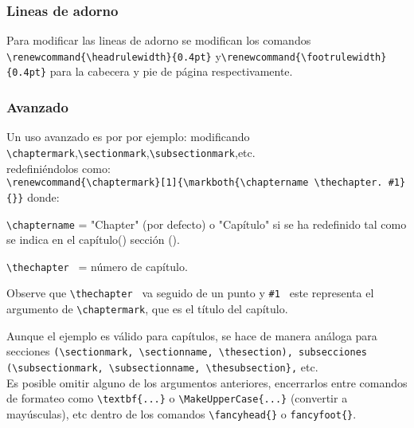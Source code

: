 \subsubsection{Lineas de adorno}
Para modificar las lineas de adorno se modifican los comandos \\
\lstinline+\renewcommand{\headrulewidth}{0.4pt}+ y\lstinline+\renewcommand{\footrulewidth}{0.4pt}+ para la cabe\-cera y pie de página respectivamente.
\subsubsection{Avanzado}
Un uso avanzado es por por ejemplo: modificando \lstinline+\chaptermark+,\lstinline+\sectionmark+,\lstinline+\subsectionmark+,etc.\\
redefiniéndolos como:\\
\lstinline+\renewcommand{\chaptermark}[1]{\markboth{\chaptername \thechapter. #1}{}}+
donde:\\
\begin{lista}
\item\lstinline+\chaptername+ = "Chapter" (por defecto) o "Capítulo"  si se ha redefinido tal como se indica en el capítulo() sección (). 
\item \lstinline+\thechapter + = número de capítulo. 
\item Observe  que \lstinline+\thechapter + va  seguido de un punto y \lstinline+#1 + este representa el argumento de \lstinline+\chaptermark+, que es el título del capítulo.
\end{lista}
Aunque el ejemplo es válido para capítulos, se hace de manera análoga para secciones \lstinline+(\sectionmark, \sectionname, \thesection), subsecciones (\subsectionmark, \subsectionname, \thesubsection},+ etc.\\
Es posible omitir alguno de los argumentos anteriores, encerrarlos entre comandos de formateo como \lstinline+\textbf{...}+ o \lstinline+\MakeUpperCase{...}+ (convertir a mayúsculas), etc dentro de los comandos \lstinline+\fancyhead{}+ o \lstinline+fancyfoot{}+.\\

